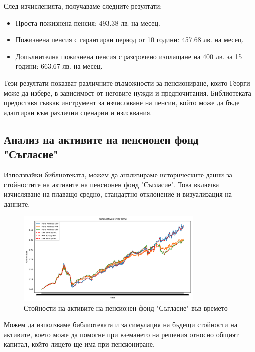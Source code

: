\documentclass[a4paper,12pt]{article}
\begin{document}
След изчисленията, получаваме следните резултати:
\begin{itemize}
        \item Проста пожизнена пенсия: 493.38 лв. на месец.
        \item Пожизнена пенсия с гарантиран период от 10 години: 457.68 лв. на месец.
        \item Допълнителна пожизнена пенсия с разсрочено изплащане на 400 лв. за 15 години: 663.67 лв. на месец.
\end{itemize}

Тези резултати показват различните възможности за пенсиониране, които Георги може да избере, в зависимост от неговите нужди и предпочитания. Библиотеката предоставя гъвкав инструмент за изчисляване на пенсии, който може да бъде адаптиран към различни сценарии и изисквания.
\subsection{Анализ на активите на пенсионен фонд "Съгласие"}
Използвайки библиотеката, можем да анализираме историческите данни за стойностите на активите на пенсионен фонд "Съгласие". Това включва изчисляване на плаващо средно, стандартно отклонение и визуализация на данните.
\begin{figure}[ht]
        \centering
        \includegraphics[width=0.8\textwidth]{images/asset_values.png}
        \caption{Стойности на активите на пенсионен фонд "Съгласие" във времето}
        \label{fig:asset_values}
\end{figure}
Можем да използваме библиотеката и за симулация на бъдещи стойности на активите, което може да помогне при вземането на решения относно общият капитал, който лицето ще има при пенсиониране.
\end{document}
